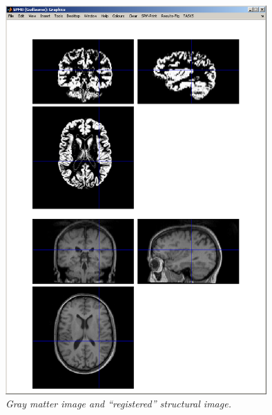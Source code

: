 \begin{figure}
\begin{center}
\includegraphics[width=100mm]{auditory/gray}
\caption{\em Gray matter image and ``registered'' structural image.\label{aud_gray}}
\end{center}
\end{figure}

